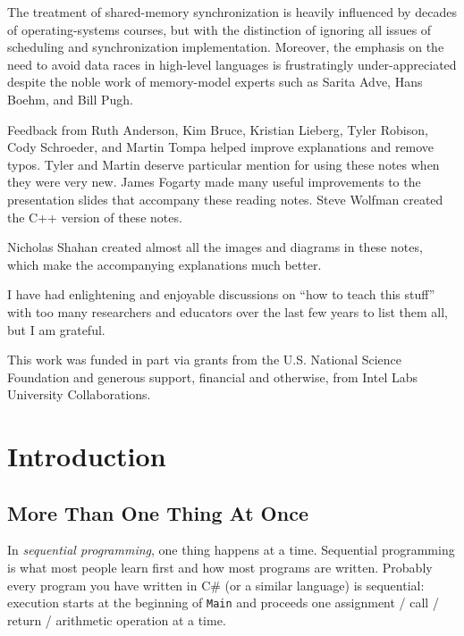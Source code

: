 \documentclass[10pt]{article}
\begin{document}
The treatment of shared-memory synchronization is heavily influenced
by decades of operating-systems courses, but with the distinction of
ignoring all issues of scheduling and synchronization implementation.
Moreover, the emphasis on the need to avoid data races in high-level
languages is frustratingly under-appreciated despite the noble work of
memory-model experts such as Sarita Adve, Hans Boehm, and Bill Pugh.

Feedback from Ruth Anderson, Kim Bruce, Kristian Lieberg, Tyler
Robison, Cody Schroeder, and Martin Tompa helped improve explanations
and remove typos.  Tyler and Martin deserve particular mention for
using these notes when they were very new.  James Fogarty made many
useful improvements to the presentation slides that accompany these
reading notes.  Steve Wolfman created the C++ version of these notes.

Nicholas Shahan created almost all the images and diagrams in these
notes, which make the accompanying explanations much better.

I have had enlightening and enjoyable discussions on ``how to teach this
stuff'' with too many researchers and educators over the last few
years to list them all, but I am grateful.

This work was funded in part via grants from the U.S. National Science
Foundation and generous support, financial and otherwise, from Intel
Labs University Collaborations.

\section{Introduction}
\label{sec:intro}

\subsection{More Than One Thing At Once}

In \emph{sequential programming}, one thing happens at a time.
Sequential programming is what most people learn first and how most
programs are written.  Probably every program you have written in C\#
(or a similar language) is sequential: execution starts at the
beginning of \texttt{Main} and proceeds one assignment / call / return
/ arithmetic operation at a time.
\end{document}
